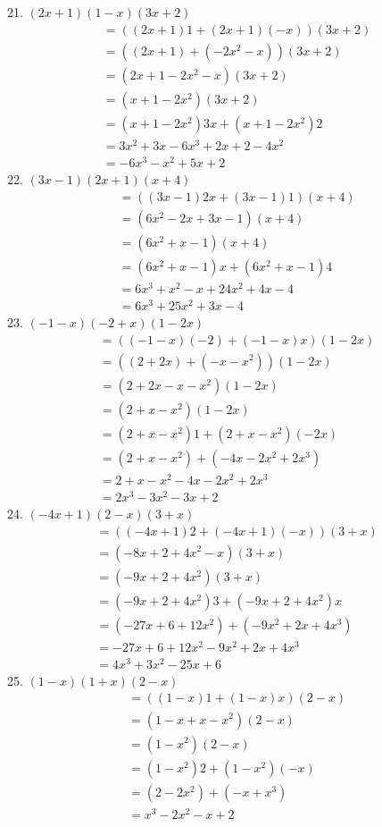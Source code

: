 \documentclass[12pt]{article}
\begin{document}
21. $(2x+1)(1-x)(3x+2)$
\begin{align*}
&=((2x+1)1+(2x+1)(-x))(3x+2) \\
&=((2x+1)+(-2x^2-x))(3x+2) \\
&=(2x+1-2x^2-x)(3x+2) \\
&=(x+1-2x^2)(3x+2) \\
&=(x+1-2x^2)3x+(x+1-2x^2)2 \\
&=3x^2+3x-6x^3+2x+2-4x^2 \\
&=-6x^3-x^2+5x+2
\end{align*}
22. $(3x-1)(2x+1)(x+4)$
\begin{align*}
&=((3x-1)2x+(3x-1)1)(x+4) \\
&=(6x^2-2x+3x-1)(x+4) \\
&=(6x^2+x-1)(x+4) \\
&=(6x^2+x-1)x+(6x^2+x-1)4 \\
&=6x^3+x^2-x+24x^2+4x-4 \\
&=6x^3+25x^2+3x-4
\end{align*}
23. $(-1-x)(-2+x)(1-2x)$
\begin{align*}
&=((-1-x)(-2)+(-1-x)x)(1-2x) \\
&=((2+2x)+(-x-x^2))(1-2x) \\
&=(2+2x-x-x^2)(1-2x) \\
&=(2+x-x^2)(1-2x) \\
&=(2+x-x^2)1+(2+x-x^2)(-2x) \\
&=(2+x-x^2)+(-4x-2x^2+2x^3) \\
&=2+x-x^2-4x-2x^2+2x^3 \\
&=2x^3-3x^2-3x+2
\end{align*}
24. $(-4x+1)(2-x)(3+x)$
\begin{align*}
&=((-4x+1)2+(-4x+1)(-x))(3+x) \\
&=(-8x+2+4x^2-x)(3+x) \\
&=(-9x+2+4x^2)(3+x) \\
&=(-9x+2+4x^2)3+(-9x+2+4x^2)x \\
&=(-27x+6+12x^2)+(-9x^2+2x+4x^3) \\
&=-27x+6+12x^2-9x^2+2x+4x^3 \\
&=4x^3+3x^2-25x+6
\end{align*}
25. $(1-x)(1+x)(2-x)$
\begin{align*}
&=((1-x)1+(1-x)x)(2-x) \\
&=(1-x+x-x^2)(2-x) \\
&=(1-x^2)(2-x) \\
&=(1-x^2)2+(1-x^2)(-x) \\
&=(2-2x^2)+(-x+x^3) \\
&=x^3-2x^2-x+2
\end{align*}
\end{document}
